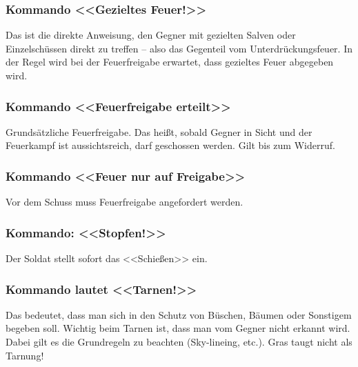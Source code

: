 \subsubsection{Kommando <<Gezieltes Feuer!>>}
	Das ist die direkte Anweisung, den Gegner mit gezielten Salven oder Einzelschüssen direkt zu treffen – also das Gegenteil vom Unterdrückungsfeuer. In der Regel wird bei der Feuerfreigabe erwartet, dass gezieltes Feuer abgegeben wird.

\subsubsection{Kommando <<Feuerfreigabe erteilt>>}
	Grundsätzliche Feuerfreigabe. Das heißt, sobald Gegner in Sicht und der Feuerkampf ist aussichtsreich, darf geschossen werden. Gilt bis zum Widerruf.

\subsubsection{Kommando <<Feuer nur auf Freigabe>>}
	Vor dem Schuss muss Feuerfreigabe angefordert werden.

\subsubsection{Kommando: <<Stopfen!>>}
	Der Soldat stellt sofort das <<Schießen>> ein.

\subsubsection{Kommando lautet <<Tarnen!>>}
	Das bedeutet, dass man sich in den Schutz von Büschen, Bäumen oder Sonstigem begeben soll. Wichtig beim Tarnen ist, dass man vom Gegner nicht erkannt wird. Dabei gilt es die Grundregeln zu beachten (Sky-lineing, etc.). Gras taugt nicht als Tarnung!

